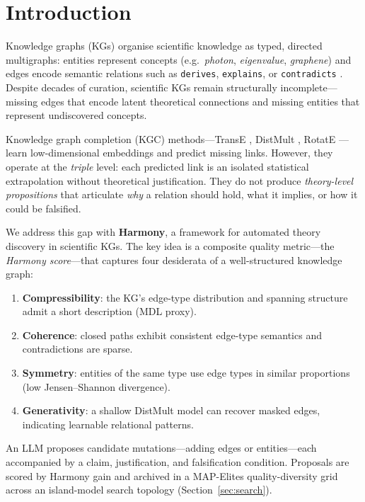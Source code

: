 \section{Introduction}\label{sec:intro}

Knowledge graphs (KGs) organise scientific knowledge as typed, directed
multigraphs: entities represent concepts (e.g.\ \emph{photon},
\emph{eigenvalue}, \emph{graphene}) and edges encode semantic relations such as
\texttt{derives}, \texttt{explains}, or \texttt{contradicts}
\citep{ji2021kgsurvey}.  Despite decades of curation, scientific KGs remain
structurally incomplete---missing edges that encode latent theoretical
connections and missing entities that represent undiscovered concepts.

Knowledge graph completion (KGC) methods---TransE \citep{bordes2013transe},
DistMult \citep{yang2015distmult}, RotatE \citep{sun2019rotate}---learn
low-dimensional embeddings and predict missing links.  However, they operate at
the \emph{triple} level: each predicted link is an isolated statistical
extrapolation without theoretical justification.  They do not produce
\emph{theory-level propositions} that articulate \emph{why} a relation should
hold, what it implies, or how it could be falsified.

We address this gap with \textbf{Harmony}, a framework for automated theory
discovery in scientific KGs.  The key idea is a composite quality metric---the
\emph{Harmony score}---that captures four desiderata of a well-structured
knowledge graph:
\begin{enumerate}[nosep]
  \item \textbf{Compressibility}: the KG's edge-type distribution and spanning
    structure admit a short description (MDL proxy).
  \item \textbf{Coherence}: closed paths exhibit consistent edge-type semantics
    and contradictions are sparse.
  \item \textbf{Symmetry}: entities of the same type use edge types in similar
    proportions (low Jensen--Shannon divergence).
  \item \textbf{Generativity}: a shallow DistMult model can recover masked edges,
    indicating learnable relational patterns.
\end{enumerate}

An LLM proposes candidate mutations---adding edges or entities---each
accompanied by a claim, justification, and falsification condition.  Proposals
are scored by Harmony gain and archived in a MAP-Elites
\citep{mouret2015mapelites} quality-diversity grid across an island-model
\citep{whitley1997island} search topology (Section~\ref{sec:search}).

